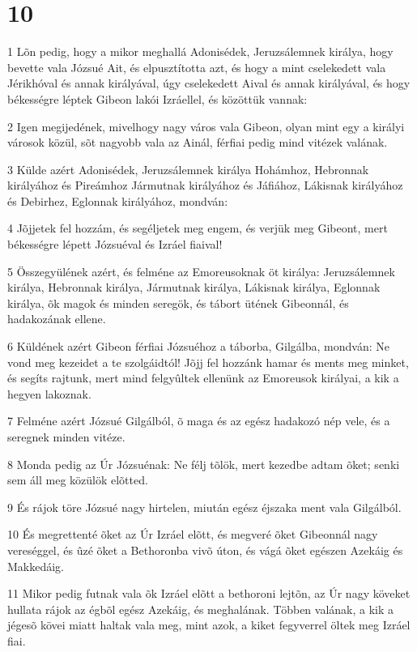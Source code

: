 \chapter{10}

\par 1 Lõn pedig, hogy a mikor meghallá Adonisédek, Jeruzsálemnek királya, hogy bevette vala Józsué Ait, és elpusztította azt, és hogy a mint cselekedett vala Jérikhóval  és annak királyával, úgy cselekedett Aival és annak királyával, és hogy békességre léptek Gibeon lakói Izráellel, és közöttük vannak:
\par 2 Igen megijedének, mivelhogy nagy város vala Gibeon, olyan mint egy a királyi városok közül, sõt nagyobb vala az Ainál, férfiai pedig mind vitézek valának.
\par 3 Külde azért Adonisédek, Jeruzsálemnek királya Hohámhoz, Hebronnak királyához és Pireámhoz Jármutnak királyához és Jáfiához, Lákisnak királyához és Debirhez, Eglonnak királyához, mondván:
\par 4 Jõjjetek fel hozzám, és segéljetek meg engem, és verjük meg Gibeont, mert békességre lépett Józsuéval és Izráel fiaival!
\par 5 Összegyülének azért, és felméne az Emoreusoknak öt királya: Jeruzsálemnek királya, Hebronnak királya, Jármutnak királya, Lákisnak királya, Eglonnak királya, õk magok és minden seregök, és tábort ütének Gibeonnál, és hadakozának ellene.
\par 6 Küldének azért Gibeon férfiai Józsuéhoz a táborba, Gilgálba, mondván: Ne vond meg kezeidet a te szolgáidtól! Jõjj fel hozzánk hamar és ments meg minket, és segíts rajtunk, mert mind felgyûltek ellenünk az Emoreusok királyai, a kik a hegyen lakoznak.
\par 7 Felméne azért Józsué Gilgálból, õ maga és az egész hadakozó nép vele, és a seregnek minden vitéze.
\par 8 Monda pedig az Úr Józsuénak: Ne félj tõlök, mert kezedbe  adtam õket; senki sem áll meg közülök elõtted.
\par 9 És rájok töre Józsué nagy hirtelen, miután egész éjszaka ment vala Gilgálból.
\par 10 És megrettenté õket az Úr Izráel elõtt, és megveré õket Gibeonnál nagy vereséggel, és ûzé õket a Bethoronba vivõ úton, és vágá õket egészen Azekáig és Makkedáig.
\par 11 Mikor pedig futnak vala õk Izráel elõtt a bethoroni lejtõn, az Úr nagy köveket hullata rájok az égbõl egész Azekáig, és meghalának. Többen valának, a kik a jégesõ kövei miatt haltak vala meg, mint azok, a kiket fegyverrel öltek meg Izráel fiai.
